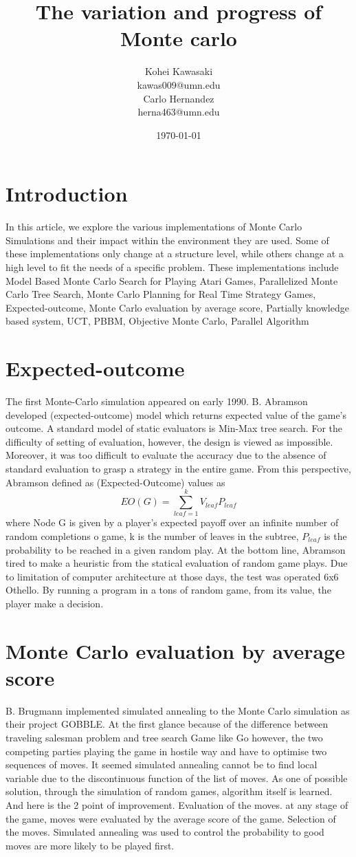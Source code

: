 \documentclass[11pt]{article}
\title{The variation and progress of Monte carlo}
\author{
Kohei Kawasaki\\kawas009@umn.edu\\
Carlo Hernandez\\herna463@umn.edu
}
\date{\today}
\begin{document}
\maketitle
\section{Introduction}
In this article, we explore the various implementations of Monte Carlo Simulations and their impact within the environment they are used. Some of these implementations only change at a structure level, while others change at a high level to fit the needs of a specific problem. These implementations include Model Based Monte Carlo Search for Playing Atari Games, Parallelized Monte Carlo Tree Search, Monte Carlo Planning for Real Time Strategy Games, Expected-outcome, Monte Carlo evaluation by average score, Partially knowledge based system, UCT, PBBM, Objective Monte Carlo, Parallel Algorithm

\section{Expected-outcome}
The first Monte-Carlo simulation appeared on early 1990. B. Abramson developed (expected-outcome) model which returns expected value of the game’s outcome\cite{abramson1990expected}. A standard model of static evaluators is Min-Max tree search. For the difficulty of setting of evaluation, however, the design is viewed as impossible. Moreover, it was too difficult to evaluate the accuracy due to the absence of standard evaluation to grasp a strategy in the entire game. From this perspective, Abramson defined as (Expected-Outcome) values as 
\[EO(G) = \sum_{leaf=1}^{k} V_{leaf} P_{leaf}\]
where Node G is given by a player’s expected payoff over an infinite number of random completions o game, k is the number of leaves in the subtree, \(P_{leaf}\) is the probability to be reached in a given random play. At the bottom line, Abramson tired to make a heuristic from the statical evaluation of random game plays. Due to limitation of computer architecture at those days, the test was operated 6x6 Othello. By running a program in a tons of random game, from its value, the player make a decision. 
\section{Monte Carlo evaluation by average score}
B. Brugmann implemented simulated annealing to the Monte Carlo simulation as their project GOBBLE\cite{brugmann1993monte}. At the first glance because of the difference between traveling salesman problem and tree search Game like Go however, the two competing parties playing the game in hostile way and have to optimise two sequences of moves. It seemed simulated annealing cannot be to find local variable due to the discontinuous function of the list of moves. As one of possible solution, through the simulation of random games, algorithm itself is learned. And here is the 2 point of improvement. Evaluation of the moves. at any stage of the game, moves were evaluated by the average score of the game. Selection of the moves. Simulated annealing was used to control the probability to good moves are more likely to be played first.
\end{document}
